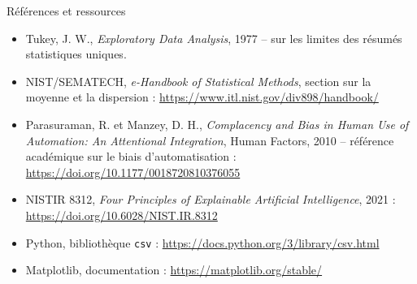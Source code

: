 \documentclass[aspectratio=169]{beamer}
\begin{document}
\begin{frame}{Références et ressources}
  \tiny
  \begin{itemize}
    \item Tukey, J. W., \emph{Exploratory Data Analysis}, 1977 -- sur les limites des résumés statistiques uniques.
    \item NIST/SEMATECH, \emph{e-Handbook of Statistical Methods}, section sur la moyenne et la dispersion : \url{https://www.itl.nist.gov/div898/handbook/}
    \item Parasuraman, R. et Manzey, D. H., \emph{Complacency and Bias in Human Use of Automation: An Attentional Integration}, Human Factors, 2010 -- référence académique sur le biais d'automatisation : \url{https://doi.org/10.1177/0018720810376055}
    \item NISTIR 8312, \emph{Four Principles of Explainable Artificial Intelligence}, 2021 : \url{https://doi.org/10.6028/NIST.IR.8312}
    \item Python, bibliothèque \texttt{csv} : \url{https://docs.python.org/3/library/csv.html}
    \item Matplotlib, documentation : \url{https://matplotlib.org/stable/}
  \end{itemize}
\end{frame}
\end{document}
